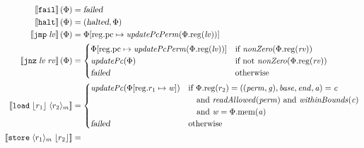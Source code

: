\documentclass[a4paper]{article}
\newcommand{\update}[2]{[#1 \mapsto #2]}
\newcommand{\sem}[1]{\left\llbracket #1 \right\rrbracket}
\newcommand{\var}[1]{\mathit{#1}}
\newcommand{\rv}{\var{rv}}
\newcommand{\lv}{\var{lv}}
\newcommand{\gl}{\var{g}}
\newcommand{\pcreg}{\mathrm{pc}}
\newcommand{\addr}{\var{a}}
\newcommand{\start}{\var{base}}
\newcommand{\addrend}{\var{end}}
\newcommand{\perm}{\var{perm}}
\newcommand{\stdcap}[1][(\perm,\gl)]{\left(#1,\start,\addrend,\addr \right)}
\newcommand{\plainproj}[1]{\mathrm{#1}}
\newcommand{\memheap}[1][\Phi]{#1.\plainproj{mem}}
\newcommand{\memreg}[1][\Phi]{#1.\plainproj{reg}}
\newcommand{\updateReg}[3][\Phi]{#1\update{\plainproj{reg}.#2}{#3}}
\newcommand{\failed}{\textsl{failed}}
\newcommand{\halted}{\textsl{halted}}
\newcommand{\plainfun}[2]{
  \ifthenelse{\equal{#2}{}}
             {\mathit{#1}}
             {\mathit{#1}(#2)}
}
\newcommand{\updatePcPerm}[1]{\plainfun{updatePcPerm}{#1}}
\newcommand{\nonZero}[1]{\plainfun{nonZero}{#1}}
\newcommand{\readAllowed}[1]{\plainfun{readAllowed}{#1}}
\newcommand{\withinBounds}[1]{\plainfun{withinBounds}{#1}}
\newcommand{\stdUpdatePc}[1]{\plainfun{updatePc}{#1}}
\newcommand{\refreg}[1]{\lfloor #1 \rfloor}
\newcommand{\refheap}[1]{\langle #1 \rangle_m}
\newcommand{\zinstr}[1]{\mathtt{#1}}
\newcommand{\fail}{\zinstr{fail}}
\newcommand{\halt}{\zinstr{halt}}
\newcommand{\oneinstr}[2]{\zinstr{#1} \; #2}
\newcommand{\jmp}[1]{\oneinstr{jmp}{#1}}
\newcommand{\twoinstr}[3]{\zinstr{#1} \; #2 \; #3}
\newcommand{\jnz}[2]{\twoinstr{jnz}{#1}{#2}}
\newcommand{\store}[2]{\twoinstr{store}{#1}{#2}}
\newcommand{\load}[2]{\twoinstr{load}{#1}{#2}}
\begin{document}
\begin{align*}
  \sem{\fail}(\Phi)                        & = \failed \\
  \sem{\halt}(\Phi)                        & = (\halted,\Phi) \\
  \sem{\jmp{\lv}}(\Phi)                    & = \updateReg{\pcreg}{\updatePcPerm{\memreg(\lv)}} \\
  \sem{\jnz{\lv}{\rv}}(\Phi)               & = 
                                             \begin{cases}
                                               \updateReg{\pcreg}{\updatePcPerm{\memreg(\lv)}} &
                                               \arraycolsep=0pt
                                               \begin{array}[t]{l}
                                                 \text{if $\nonZero{\memreg(\rv)}$} 
                                               \end{array}\\
                                               \stdUpdatePc{\Phi} & \text{if not $\nonZero{\memreg(\rv)}$}\\
                                               \failed & \text{otherwise }
                                             \end{cases} \\
 \sem{\load{\refreg{r_1}}{\refheap{r_2}}}  & = 
                                             \begin{cases}
                                               \stdUpdatePc{\updateReg{r_1}{\var{w}}} &
                                               \arraycolsep=0pt
                                               \begin{array}[t]{l}
                                                 \text{if }\memreg(r_2) = \stdcap = \var{c} \\
                                                 \quad\text{and }\readAllowed{\perm} \text{ and } \withinBounds{\var{c}} \\
                                                 \quad\text{and }\var{w} = \memheap(\addr)
                                               \end{array}\\
                                               \failed & \text{otherwise }
                                             \end{cases}\\
 \sem{\store{\refheap{r_1}}{\refreg{r_2}}} & = 

\end{align*}
\end{document}
